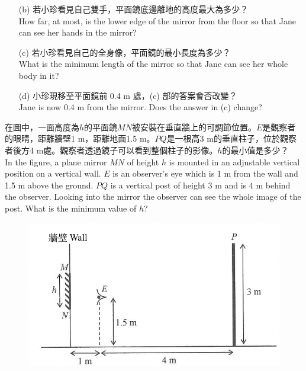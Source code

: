 \documentclass[beamer=true]{standalone}
\begin{document}
\begin{eg}
    \begin{itemize}
        \item [(b)] 若小珍看見自己雙手，平面鏡底邊離地的高度最大為多少？\\How far, at most, is the lower edge of the mirror from the floor so that Jane can see her hands in the mirror?
    \end{itemize}
\end{eg}

\begin{eg}
    \begin{itemize}
        \item [(c)] 若小珍看見自己的全身像，平面鏡的最小長度為多少？\\What is the minimum length of the mirror so that Jane can see her whole body in it?
    \end{itemize}

\end{eg}

\begin{eg}
    \begin{itemize}
        \item [(d)] 小珍現移至平面鏡前 0.4 m 處，(c) 部的答案會否改變？\\Jane is now 0.4 m from the mirror. Does the answer in (c) change?
    \end{itemize}
\end{eg}

\begin{eg}
在圖中，一面高度為$h$的平面鏡$MN$被安裝在垂直牆上的可調節位置。$E$是觀察者的眼睛，距離牆壁1 m，距離地面1.5 m。$PQ$是一根高3 m的垂直柱子，位於觀察者後方4 m處。觀察者透過鏡子可以看到整個柱子的影像。$h$的最小值是多少？\\In the figure, a plane mirror $MN$ of height $h$ is mounted in an adjustable vertical position on a vertical wall. $E$ is an observer's eye which is 1 m from the wall and 1.5 m above the ground. $PQ$ is a vertical post of height 3 m and is 4 m behind the observer. Looking into the mirror the observer can see the whole image of the post. What is the minimum value of $h$?
    \begin{figure}
        \centering
        \includegraphics[width=0.4\linewidth]{assets/dwddd89u2j38d2.png}
    \end{figure}
\end{eg}
\end{document}
